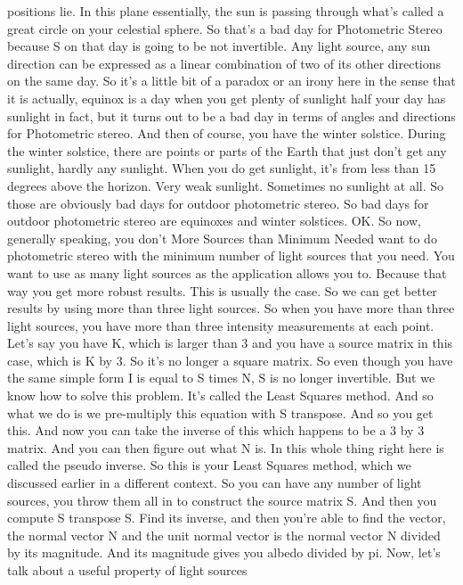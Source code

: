 \documentclass[12pt]{article}
\begin{document}
positions lie.
In this plane essentially, the sun
is passing through what's called a great circle
on your celestial sphere.
So that's a bad day for Photometric Stereo
because S on that day is going to be not invertible.
Any light source, any sun direction
can be expressed as a linear combination
of two of its other directions on the same day.
So it's a little bit of a paradox or an irony
here in the sense that it is actually,
equinox is a day when you get plenty of sunlight half your day
has sunlight in fact, but it turns out
to be a bad day in terms of angles and directions
for Photometric stereo.
And then of course, you have the winter solstice.
During the winter solstice, there
are points or parts of the Earth that
just don't get any sunlight, hardly any sunlight.
When you do get sunlight, it's from less than 15 degrees
above the horizon.
Very weak sunlight.
Sometimes no sunlight at all.
So those are obviously bad days for outdoor photometric stereo.
So bad days for outdoor photometric stereo are equinoxes
and winter solstices.
OK.
So now, generally speaking, you don't
More Sources than Minimum Needed
want to do photometric stereo with the minimum number
of light sources that you need.
You want to use as many light sources
as the application allows you to.
Because that way you get more robust results.
This is usually the case.
So we can get better results by using
more than three light sources.
So when you have more than three light sources,
you have more than three intensity measurements
at each point.
Let's say you have K, which is larger than 3
and you have a source matrix in this case, which is K by 3.
So it's no longer a square matrix.
So even though you have the same simple form
I is equal to S times N, S is no longer invertible.
But we know how to solve this problem.
It's called the Least Squares method.
And so what we do is we pre-multiply
this equation with S transpose.
And so you get this.
And now you can take the inverse of this which happens to be a 3
by 3 matrix.
And you can then figure out what N is.
In this whole thing right here is called the pseudo inverse.
So this is your Least Squares method,
which we discussed earlier in a different context.
So you can have any number of light sources,
you throw them all in to construct the source matrix S.
And then you compute S transpose S. Find its inverse,
and then you're able to find the vector,
the normal vector N and the unit normal vector
is the normal vector N divided by its magnitude.
And its magnitude gives you albedo divided by pi.
Now, let's talk about a useful property of light sources
\end{document}
